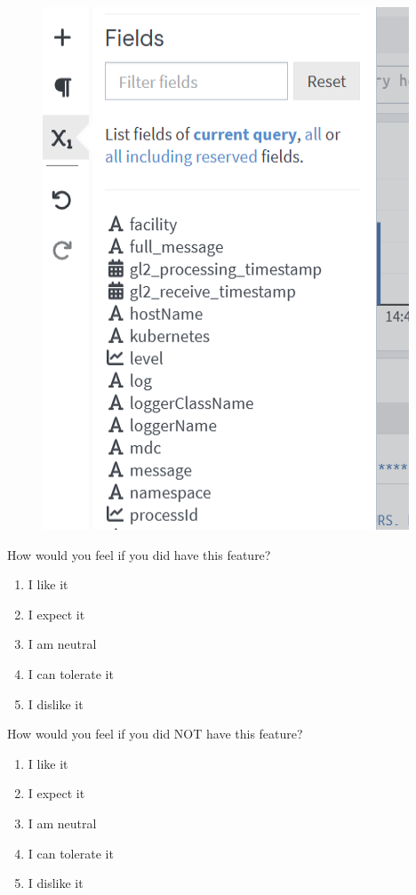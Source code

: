 \documentclass[../main.tex]{subfiles}
\begin{document}
\begin{enumerate}
    \begin{figure}[H]
        \centering
        \includegraphics[scale=1]{img/10-appendix/fields.png}
        \label{fig:fields}
    \end{figure}

    How would you feel if you did have this feature?
    
    \begin{enumerate}
        \item I like it
        \item I expect it
        \item  I am neutral
        \item I can tolerate it
        \item I dislike it
    \end{enumerate}

    How would you feel if you did NOT have this feature?
    
    \begin{enumerate}
        \item I like it
        \item I expect it
        \item  I am neutral
        \item I can tolerate it
        \item I dislike it
    \end{enumerate}


\end{enumerate}
\end{document}
